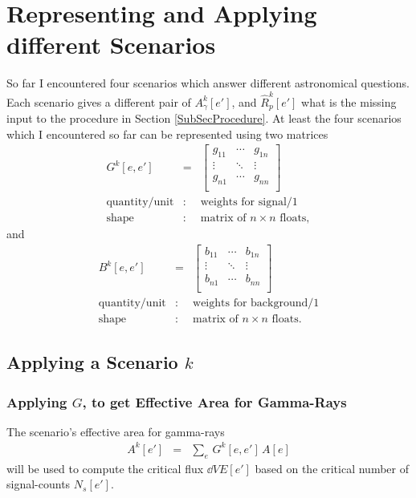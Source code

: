 \documentclass{article}%
\begin{document}
    \section{Representing and Applying different Scenarios}
        So far I encountered four scenarios which answer different astronomical questions.
        Each scenario gives a different pair of $A^k_\gamma[e']$, and $\hat{R}^k_p[e']$ what is the missing input to the procedure in Section \ref{SubSecProcedure}.
        At least the four scenarios which I encountered so far can be represented using two matrices
        \begin{eqnarray*}
            G^k[e, e'] &=&
              \left[ {\begin{array}{ccc}
                g_{11} & \cdots & g_{1n}\\
                \vdots & \ddots & \vdots\\
                g_{n1} & \cdots & g_{nn}\\
              \end{array} } \right]\\
            \text{quantity}/\text{unit} &:& \text{weights for signal}/1\\
            \text{shape} &:& \text{matrix of}\,\,n \times n \,\,\text{floats},
        \end{eqnarray*}
        and
        \begin{eqnarray*}
            B^k[e, e'] &=&
              \left[ {\begin{array}{cccc}
                b_{11} & \cdots & b_{1n}\\
                \vdots & \ddots & \vdots\\
                b_{n1} & \cdots & b_{nn}\\
              \end{array} } \right]\\
            \text{quantity}/\text{unit} &:& \text{weights for background}/1\\
            \text{shape} &:& \text{matrix of}\,\,n \times n \,\,\text{floats}.
        \end{eqnarray*}
        \subsection{Applying a Scenario $k$}
            \subsubsection*{Applying $G$, to get Effective Area for Gamma-Rays}
                The scenario's effective area for gamma-rays
                \begin{eqnarray}
                    A^k[e'] &=& \sum_{e} \, G^k[e, e'] \, A[e]
                \end{eqnarray}
                will be used to compute the critical flux $\dd{V}{E}[e']$ based on the critical number of signal-counts $N_s[e']$.
\end{document}

